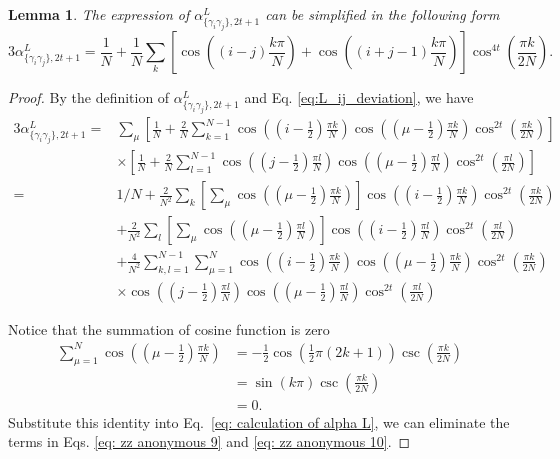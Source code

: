 \documentclass[showpacs,onecolumn,aps,prx,long bibliography,superscriptaddress,notitlepage]{revtex4-1}
\newtheorem{lemma}{Lemma}
\newcommand{\alpl}{\alpha_{\{\gamma_i\gamma_j\}, 2t+1}^{L}}
\begin{document}
\begin{lemma}
\label{lemma: simplification of alpha L}
The expression of $\alpl$ can be simplified in the following form
    \begin{equation}
    \label{eq: alpha L}
        3\alpl=\frac{1}{N}+\frac{1}{N} \sum_k\left[\cos \left((i-j) \frac{k \pi}{N}\right)+\cos \left((i+j-1) \frac{k \pi}{N}\right)\right] \cos ^{4 t}\left(\frac{\pi k}{2 N}\right).
    \end{equation}
\end{lemma}
\begin{proof}
By the definition of $\alpl$ and Eq. \ref{eq:L_ij_deviation}, we have
\begin{align}
    3\alpl =& \sum_\mu \left[ \frac{1}{N} + \frac{2}{N} \sum_{k=1}^{N-1} \cos \left(\left(i-\frac{1}{2}\right) \frac{\pi k}{N}\right) \cos \left(\left(\mu-\frac{1}{2}\right) \frac{\pi k}{N}\right) \cos ^{2 t} \left( \frac{\pi k}{2 N} \right)\right] \nonumber\\
     &\times\left[ \frac{1}{N} + \frac{2}{N} \sum_{l=1}^{N-1} \cos \left(\left(j-\frac{1}{2}\right) \frac{\pi l}{N}\right) \cos \left(\left(\mu-\frac{1}{2}\right) \frac{\pi l}{N}\right) \cos ^{2 t}\left( \frac{\pi l}{2 N} \right)  \right] \nonumber\\
     =& 1/N + \frac{2}{N^2} \sum_k \left[\sum_\mu \cos\left(\left(\mu-\frac{1}{2}\right) \frac{\pi k}{N}\right)  \right] 
     \cos \left(\left(i-\frac{1}{2}\right) \frac{\pi k}{N}\right) \cos ^{2 t} \left( \frac{\pi k}{2 N} \right) 
     \label{eq: zz anonymous 9}
     \\
     &+ \frac{2}{N^2} \sum_l \left[\sum_\mu \cos\left(\left(\mu-\frac{1}{2}\right) \frac{\pi l}{N}\right)  \right] 
     \cos \left(\left(i-\frac{1}{2}\right) \frac{\pi l}{N}\right) \cos ^{2 t} \left( \frac{\pi l}{2 N} \right) 
     \label{eq: zz anonymous 10}
     \\
     &+ \frac{4}{N^2} \sum_{k,l =1}^{N-1} \sum_{\mu = 1}^{N} \cos \left(\left(i-\frac{1}{2}\right) \frac{\pi k}{N}\right) \cos \left(\left(\mu-\frac{1}{2}\right) \frac{\pi k}{N}\right) \cos ^{2 t} \left( \frac{\pi k}{2 N} \right)  \nonumber\\
     &\times \cos \left(\left(j-\frac{1}{2}\right) \frac{\pi l}{N}\right) \cos \left(\left(\mu-\frac{1}{2}\right) \frac{\pi l}{N}\right) \cos ^{2 t}\left( \frac{\pi l}{2 N} \right)  
     \label{eq: calculation of alpha L}
\end{align}


Notice that the summation of cosine function is zero 
\begin{equation}
\begin{aligned}
\sum_{\mu=1}^{N} \cos\left(\left(\mu-\frac{1}{2}\right) \frac{\pi k}{N}\right)& =-\frac{1}{2} \cos \left(\frac{1}{2} \pi(2 k+1)\right) \csc \left(\frac{\pi k}{2 N}\right) \\
& =\sin (k \pi) \csc \left(\frac{\pi k}{2 N}\right) \\
& =0.
\end{aligned}
\end{equation}
Substitute this identity into Eq.~\eqref{eq: calculation of alpha L}, we can eliminate the terms in Eqs. \eqref{eq: zz anonymous 9} and \eqref{eq: zz anonymous 10}. 


\end{proof}
\end{document}
